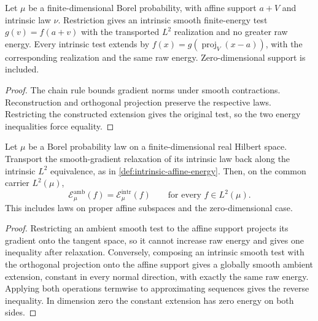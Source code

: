 \begin{lemma}
  \label{lem:smooth-tests-affine-restriction-extension}
  \leanok
  Let $\mu$ be a finite-dimensional Borel probability, with affine support $a+V$ and intrinsic
  law $\nu$. Restriction gives an intrinsic smooth finite-energy test $g(v)=f(a+v)$ with the
  transported $L^2$ realization and no greater raw energy. Every intrinsic test extends by
  $f(x)=g(\operatorname{proj}_V(x-a))$, with the corresponding realization and the same raw energy.
  Zero-dimensional support is included.
\end{lemma}
\begin{proof}
  \leanok
  The chain rule bounds gradient norms under smooth contractions. Reconstruction and orthogonal
  projection preserve the respective laws. Restricting the constructed extension gives the
  original test, so the two energy inequalities force equality.
\end{proof}

\begin{theorem}
  \label{thm:ambient-intrinsic-relaxation-equality}
  \leanok
  Let $\mu$ be a Borel probability law on a finite-dimensional real Hilbert space.  Transport the
  smooth-gradient relaxation of its intrinsic law back along the intrinsic $L^2$ equivalence, as
  in \cref{def:intrinsic-affine-energy}.  Then, on the common carrier $L^2(\mu)$,
  \[
    \mathcal E^{\mathrm{amb}}_\mu(f)
      =\mathcal E^{\mathrm{intr}}_\mu(f)
    \qquad\text{for every }f\in L^2(\mu).
  \]
  This includes laws on proper affine subspaces and the zero-dimensional case.
\end{theorem}
\begin{proof}
  \leanok
   Restricting an ambient smooth test to the affine support projects its gradient onto the
  tangent space, so it cannot increase raw energy and gives one inequality after relaxation.
  Conversely, composing an intrinsic smooth test with the orthogonal projection onto the affine
  support gives a globally smooth ambient extension, constant in every normal direction, with
  exactly the same raw energy.  Applying both operations termwise to approximating sequences gives
  the reverse inequality.  In dimension zero the constant extension has zero energy on both sides.
\end{proof}

